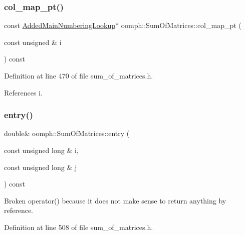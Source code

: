 \subsubsection{\texorpdfstring{col\+\_\+map\+\_\+pt()}{col\_map\_pt()}}
{\footnotesize\ttfamily const \hyperlink{classoomph_1_1AddedMainNumberingLookup}{Added\+Main\+Numbering\+Lookup}$\ast$ oomph\+::\+Sum\+Of\+Matrices\+::col\+\_\+map\+\_\+pt (\begin{DoxyParamCaption}\item[{const unsigned \&}]{i }\end{DoxyParamCaption}) const\hspace{0.3cm}{\ttfamily [inline]}}



Definition at line 470 of file sum\+\_\+of\+\_\+matrices.\+h.



References i.

\mbox{\label{classoomph_1_1SumOfMatrices_a848fff3077a0074c5cd33cc75913fbbd}} 
\subsubsection{\texorpdfstring{entry()}{entry()}}
{\footnotesize\ttfamily double\& oomph\+::\+Sum\+Of\+Matrices\+::entry (\begin{DoxyParamCaption}\item[{const unsigned long \&}]{i,  }\item[{const unsigned long \&}]{j }\end{DoxyParamCaption}) const\hspace{0.3cm}{\ttfamily [inline]}}



Broken operator() because it does not make sense to return anything by reference. 



Definition at line 508 of file sum\+\_\+of\+\_\+matrices.\+h.

\mbox{\label{classoomph_1_1SumOfMatrices_abc094faeb49c465a2907830afe71ab79}} 
